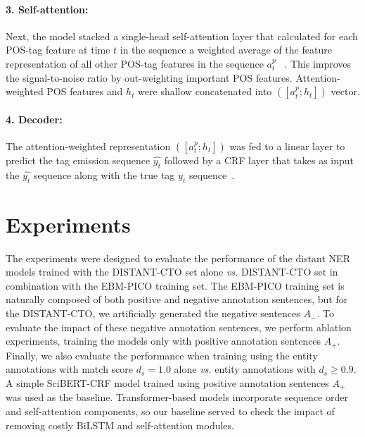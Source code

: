\documentclass[11pt]{article}
\begin{document}
\paragraph{3. Self-attention: }
%
Next, the model stacked a single-head self-attention layer that calculated for each POS-tag feature at time $t$ in the sequence a weighted average of the feature representation of all other POS-tag features in the sequence $a^{p}_{t}$ ~\cite{vaswani2017attention}.
This improves the signal-to-noise ratio by out-weighting important POS features.
Attention-weighted POS features and $h_{t}$ were shallow concatenated into $([a^{p}_{t}; h_{t}])$ vector.
%
\paragraph{4. Decoder:}
%
The attention-weighted representation $([a^{p}_{t}; h_{t}])$ was fed to a linear layer to predict the tag emission sequence $\hat{y_{t}}$ followed by a CRF layer that takes as input the $\hat{y_{t}}$ sequence along with the true tag $y_{t}$ sequence~\cite{huang2015bidirectional}.
%
%
%
\section{Experiments}
\label{sec:experiments}
%
The experiments were designed to evaluate the performance of the distant NER models trained with the DISTANT-CTO set alone \textit{vs.} DISTANT-CTO set in combination with the EBM-PICO training set.
The EBM-PICO training set is naturally composed of both positive and negative annotation sentences, but for the DISTANT-CTO, we artificially generated the negative sentences $A_{-}$.
To evaluate the impact of these negative annotation sentences, we perform ablation experiments, training the models only with positive annotation sentences $A_{+}$.
Finally, we also evaluate the performance when training using the entity annotations with match score $d_s = 1.0$ alone \textit{vs.} entity annotations with $d_s \geq 0.9$.
A simple SciBERT-CRF model trained using positive annotation sentences $A_{+}$ was used as the baseline. 
Transformer-based models incorporate sequence order and self-attention components, so our baseline served to check the impact of removing costly BiLSTM and self-attention modules.
%
%
\end{document}
